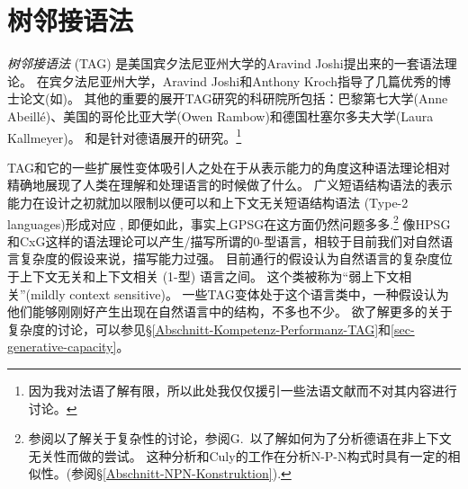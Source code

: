 
\chapter{树邻接语法}
\label{Kapitel-TAG}

\newcommand{\dotted}[0]{\makedash{2pt}}
\newcommand{\g}[1]{{\footnotesize $#1$}}


\emph{树邻接语法} (TAG)
是美国宾夕法尼亚州大学的Aravind Joshi提出来的一套语法理论\citep*{JLT75a-u}。
在宾夕法尼亚州大学，Aravind Joshi和Anthony Kroch指导了几篇优秀的博士论文(如\citealp{Rambow94a})。
其他的重要的展开TAG研究的科研院所包括：巴黎第七大学(Anne Abeill\'{e})、美国的哥伦比亚大学(Owen Rambow)和德国杜塞尔多夫大学(Laura Kallmeyer)。
和是针对德语展开的研究。\footnote{
  因为我对法语了解有限，所以此处我仅仅援引一些法语文献而不对其内容进行讨论。
}

TAG和它的一些扩展性变体吸引人之处在于从表示能力的角度这种语法理论相对精确地展现了人类在理解和处理语言的时候做了什么。
广义短语结构语法\indexgpsg 的表示能力在设计之初就加以限制以便可以和上下文无关短语结构语法 (Type-2 languages)形成对应 ,
即便如此，事实上GPSG在这方面仍然问题多多\citep{Shieber85a,Culy85a}.\footnote{%
  参阅\citet{Pullum86a}以了解关于复杂性的讨论，参阅G.\ 以了解如何为了分析德语在非上下文无关性而做的尝试。
  这种分析和Culy的工作在分析N-P-N构式时具有一定的相似性。(参阅\S \ref{Abschnitt-NPN-Konstruktion}).%
	} 
像HPSG\indexhpsg 和CxG\indexcxg 这样的语法理论可以产生/描写所谓的0-型语言，相较于目前我们对自然语言复杂度的假设来说，描写能力过强。
目前通行的假设认为自然语言的复杂度位于上下文无关和上下文相关 (1-型) 语言之间。
这个类被称为``弱上下文相关''({mildly context sensitive})。
一些TAG变体处于这个语言类中，一种假设认为他们能够刚刚好产生出现在自然语言中的结构，不多也不少。
欲了解更多的关于复杂度的讨论，可以参见\S \ref{Abschnitt-Kompetenz-Performanz-TAG}和\ref{sec-generative-capacity}。

